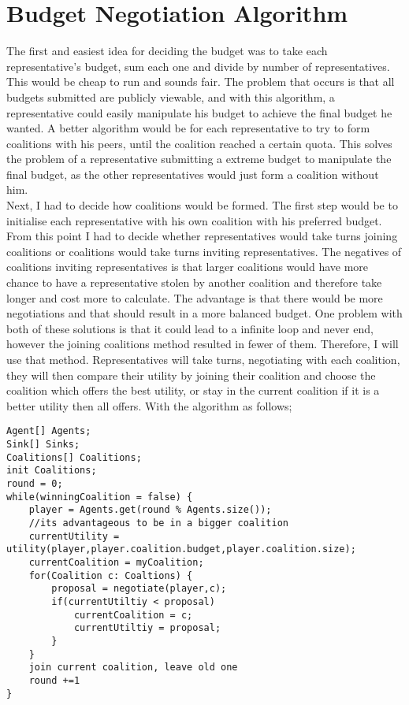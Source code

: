 \section{Budget Negotiation Algorithm}
The first and easiest idea for deciding the budget was to take each representative's budget, sum each one and divide by number of representatives. This would be cheap to run and sounds fair. The problem that occurs is that all budgets submitted are publicly viewable, and with this algorithm, a representative could easily manipulate his budget to achieve the final budget he wanted. 
A better algorithm would be for each representative to try to form coalitions with his peers, until the coalition reached a certain quota. This solves the problem of a representative submitting a extreme budget to manipulate the final budget, as the other representatives would just form a coalition without him.  
\\
Next, I had to decide how coalitions would be formed. The first step would be to initialise each representative with his own coalition with his preferred budget. From this point I had to decide whether representatives would take turns joining coalitions or coalitions would take turns inviting representatives. The negatives of coalitions inviting representatives is that larger coalitions would have more chance to have a representative stolen by another coalition and therefore take longer and cost more to calculate. The advantage is that there would be more negotiations and that should result in a more balanced budget. One problem with both of these solutions is that it could lead to a infinite loop and never end, however the joining coalitions method resulted in fewer of them. Therefore, I will use that method. Representatives will take turns, negotiating with each coalition, they will then compare their utility by joining their coalition and choose the coalition which offers the best utility, or stay in the current coalition if it is a better utility then all offers. With the algorithm as follows;
\begin{lstlisting}
Agent[] Agents;
Sink[] Sinks;
Coalitions[] Coalitions;
init Coalitions;
round = 0;
while(winningCoalition = false) {
	player = Agents.get(round % Agents.size());
	//its advantageous to be in a bigger coalition
	currentUtility = utility(player,player.coalition.budget,player.coalition.size);
	currentCoalition = myCoalition;
	for(Coalition c: Coaltions) {
		proposal = negotiate(player,c);
		if(currentUtiltiy < proposal)
			currentCoalition = c;
			currentUtiltiy = proposal;
		}
	}
	join current coalition, leave old one
	round +=1
}
\end{lstlisting}
